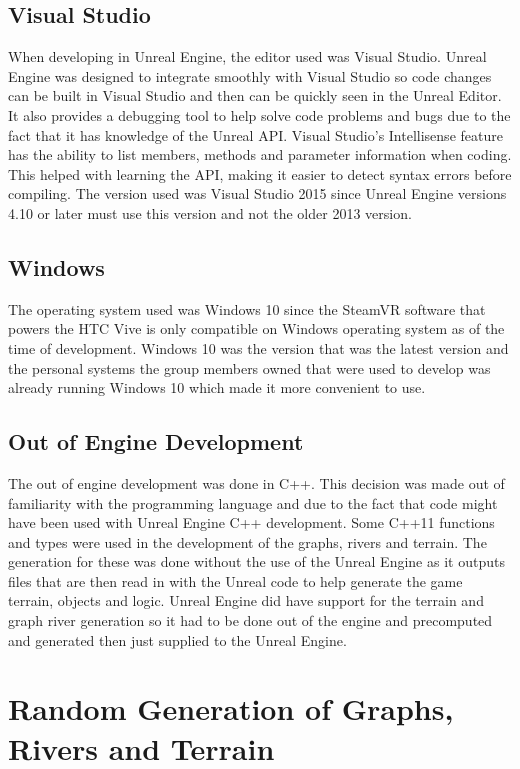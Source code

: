 \subsection{Visual Studio}
When developing in Unreal Engine, the editor used was Visual Studio. Unreal Engine was designed to integrate smoothly with Visual Studio so code changes can be built in Visual Studio and then can be quickly seen in the Unreal Editor. It also provides a debugging tool to help solve code problems and bugs due to the fact that it has knowledge of the Unreal API. Visual Studio's Intellisense feature has the ability to list members, methods and parameter information when coding. This helped with learning the API, making it easier to detect syntax errors before compiling. The version used was Visual Studio 2015 since Unreal Engine versions 4.10 or later must use this version and not the older 2013 version.

\subsection{Windows}
The operating system used was Windows 10 since the SteamVR software that powers the HTC Vive is only compatible on Windows operating system as of the time of development. Windows 10 was the version that was the latest version and the personal systems the group members owned that were used to develop was already running Windows 10 which made it more convenient to use.

\subsection{Out of Engine Development}
The out of engine development was done in C++. This decision was made out of familiarity with the programming language and due to the fact that code might have been used with Unreal Engine C++ development. Some C++11 functions and types were used in the development of the graphs, rivers and terrain. The generation for these was done without the use of the Unreal Engine as it outputs files that are then read in with the Unreal code to help generate the game terrain, objects and logic. Unreal Engine did have support for the terrain and graph river generation so it had to be done out of the engine and precomputed and generated then just supplied to the Unreal Engine.

\section{Random Generation of Graphs, Rivers and Terrain}

